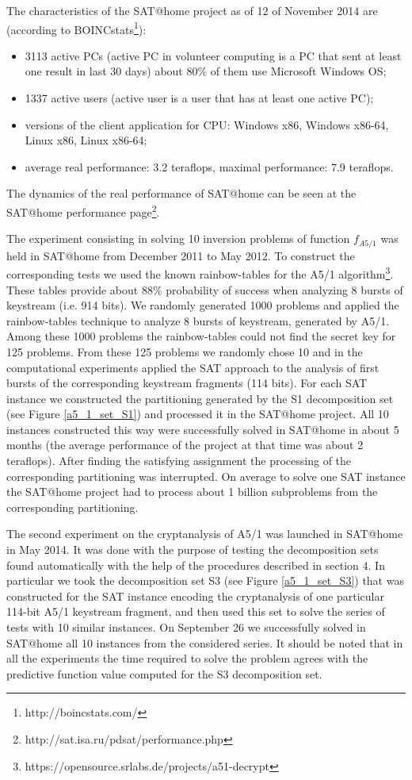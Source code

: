\documentclass[runningheads,a4paper]{llncs}
\begin{document}
The characteristics of the SAT@home project as of 12 of November 2014 are (according to BOINCstats\footnote{http://boincstats.com/}):
\begin{itemize}
	\item 3113 active PCs (active PC in volunteer computing is a PC that sent at least one result in last 30 days) about 80\% of them use Microsoft Windows OS;
	\item 1337 active users (active user is a user that has at least one active PC);
	\item	versions of the client application for CPU: Windows x86, Windows x86-64, Linux x86, Linux x86-64;
	\item average real performance: 3.2 teraflops, maximal performance: 7.9 teraflops.
\end{itemize}
The dynamics of the real performance of SAT@home can be seen at the SAT@home performance page\footnote{http://sat.isa.ru/pdsat/performance.php}.

The experiment consisting in solving 10 inversion problems of function $f_{A5/1}$ was held in SAT@home from December 2011 to May 2012. To construct the corresponding tests we used the known rainbow-tables for the A5/1 algorithm\footnote{https://opensource.srlabs.de/projects/a51-decrypt}. These tables provide about 88\% probability of success when analyzing 8 bursts of keystream (i.e. 914 bits). We randomly generated 1000 problems and applied the rainbow-tables technique to analyze 8 bursts of keystream, generated by A5/1. Among these 1000 problems the rainbow-tables could not find the secret key for 125 problems. From these 125 problems we randomly chose 10 and in the computational experiments applied the SAT approach to the analysis of first bursts of the corresponding keystream fragments (114 bits). For each SAT instance we constructed the partitioning generated by the S1 decomposition set (see Figure \ref{a5_1_set_S1}) and processed it in the SAT@home project. All 10 instances constructed this way were successfully solved in SAT@home in about 5 months (the average performance of the project at that time was about 2 teraflops). After finding the satisfying assignment the processing of the corresponding partitioning was interrupted. On average to solve one SAT instance the SAT@home project had to process about 1 billion subproblems from the corresponding partitioning.

The second experiment on the cryptanalysis of A5/1 was launched in SAT@home in May 2014. It was done with the purpose of testing the decomposition sets found automatically with the help of the procedures described in section 4. In particular we took the decomposition set S3 (see Figure \ref{a5_1_set_S3}) that was constructed for the SAT instance encoding the cryptanalysis of one particular 114-bit A5/1 keystream fragment, and then used this set to solve the series of tests with 10 similar instances. On September 26 we successfully solved in SAT@home all 10 instances from the considered series. It should be noted that in all the experiments the time required to solve the problem agrees with the predictive function value computed for the S3 decomposition set.
\end{document}
